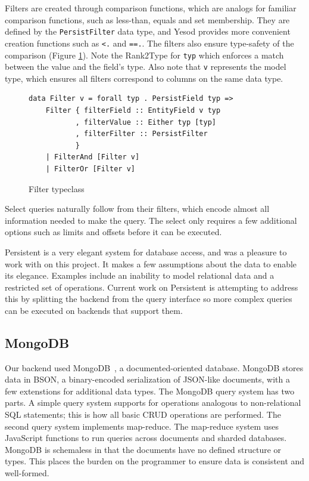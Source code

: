 \documentclass[letterpaper,twocolumn,9pt]{article}
\newcommand{\code}[1]{\texttt{#1}}
\begin{document}
Filters are created through comparison functions, which are analogs for familiar comparison functions, such as less-than, equals and set membership.  They are defined by the \code{PersistFilter} data type, and Yesod provides more convenient creation functions such as \code{<.} and \code{==.}.  The filters also ensure type-safety of the comparison (Figure \ref{Filter}).  Note the Rank2Type for \code{typ} which enforces a match between the value and the field's type.  Also note that \code{v} represents the model type, which ensures all filters correspond to columns on the same data type.
\begin{figure}[]
\footnotesize{
\begin{verbatim}
data Filter v = forall typ . PersistField typ =>
    Filter { filterField :: EntityField v typ
           , filterValue :: Either typ [typ]
           , filterFilter :: PersistFilter
           }
    | FilterAnd [Filter v]
    | FilterOr [Filter v]
\end{verbatim}
}
    \caption{Filter typeclass}
    \label{Filter}
\end{figure}
Select queries naturally follow from their filters, which encode almost all information needed to make the query.  The select only requires a few additional options such as limits and offsets before it can be executed.

Persistent is a very elegant system for database access, and was a pleasure to work with on this project.  It makes a few assumptions about the data to enable its elegance.  Examples include an inability to model relational data and a restricted set of operations.  Current work on Persistent is attempting to address this by splitting the backend from the query interface so more complex queries can be executed on backends that support them.

\subsection{MongoDB}

Our backend used MongoDB~\cite{mongo}, a documented-oriented database. MongoDB stores data in BSON, a binary-encoded serialization of JSON-like documents, with a few extenstions for additional data types.  The MongoDB query system has two parts.  A simple query system supports for operations analogous to non-relational SQL statements; this is how all basic CRUD operations are performed.  The second query system implements map-reduce.  The map-reduce system uses JavaScript functions to run queries across documents and sharded databases.  MongoDB is schemaless in that the documents have no defined structure or types.  This places the burden on the programmer to ensure data is consistent and well-formed.
\end{document}
